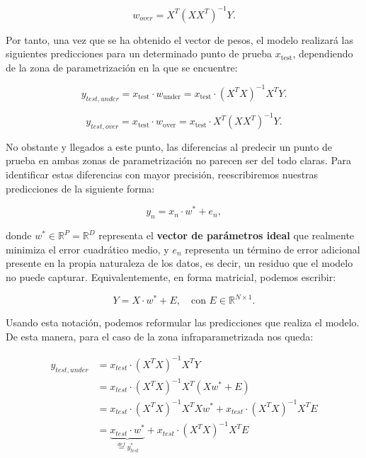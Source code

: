\begin{equation}
    w_{over} = X^{T}{(XX^{T})}^{-1}Y.
\end{equation}

Por tanto, una vez que se ha obtenido el vector de pesos, el modelo realizará las siguientes predicciones para un determinado punto de prueba $x_{\text{test}}$, dependiendo de la zona de parametrización en la que se encuentre:

\begin{equation}
    y_{test, under} = x_{\text{test}} \cdot w_{\text{under}} = x_{\text{test}} \cdot {(X^{T}X)}^{-1}X^{T}Y.
\end{equation}

\begin{equation}
    y_{test, over} = x_{\text{test}} \cdot w_{\text{over}} = x_{\text{test}} \cdot X^{T}{(XX^{T})}^{-1}Y.
\end{equation}

No obstante y llegados a este punto, las diferencias al predecir un punto de prueba en ambas zonas de parametrización no parecen ser del todo claras. Para identificar estas diferencias con mayor precisión, reescribiremos nuestras predicciones de la siguiente forma:

\[
    y_n = x_n \cdot w^{*} + e_n,
\]

donde $w^{*} \in \mathbb{R}^{P} = \mathbb{R}^{D}$ representa el \textbf{vector de parámetros ideal} que realmente minimiza el error cuadrático medio, y $e_n$ representa un término de error adicional presente en la propia naturaleza de los datos, es decir, un residuo que el modelo no puede capturar. Equivalentemente, en forma matricial, podemos escribir:

\[
    Y = X \cdot w^{*} + E, \quad \text{con } E \in \mathbb{R}^{N \times 1}.
\]

Usando esta notación, podemos reformular las predicciones que realiza el modelo. De esta manera, para el caso de la zona infraparametrizada nos queda:

\begin{align}
    y_{test, under} &= x_{test} \cdot {(X^T X)}^{-1} X^T Y \\
    &= x_{test} \cdot {(X^T X)}^{-1} X^T (X w^{*} + E) \\
    &= x_{test} \cdot {(X^T X)}^{-1} X^T X w^{*} + x_{test} \cdot {(X^T X)}^{-1} X^T E \\
    &= \underbrace{x_{test} \cdot w^{*}}_{\overset{def}{=} y^*_{test}} + x_{test} \cdot {(X^T X)}^{-1} X^T E
\end{align}

